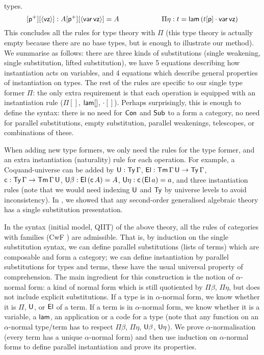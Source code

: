 \documentclass{easychair}
\begin{document}
types.
\[
[\mathsf{p}^+][\langle\mathsf{vz}\rangle] : A[\mathsf{p}^+][\langle\mathsf{var}\,\mathsf{vz}\rangle] = A \hspace{6em}\Pi\eta : t = \mathsf{lam}\,(t[\mathsf{p}]\cdot\mathsf{var}\,\mathsf{vz})
\]
This concludes all the rules for type theory with $\Pi$ (this type theory is actually empty because there are no base types, but is enough to illustrate our method). We summarise
as follows: there are three kinds of substitutions (single weakening,
single substitution, lifted substitution), we have 5 equations
describing how instantiation acts on variables, and 4 equations which
describe general properties of instantiation on types. The rest of the
rules are specific to our single type former $\Pi$: the only extra
requirement is that each operation is equipped with an instantiation
rule ($\Pi[]$, $\mathsf{lam}[]$, ${\cdot}[]$). Perhaps surprisingly, this is
enough to define the syntax: there is no need for $\mathsf{Con}$ and $\mathsf{Sub}$ to
a form a category, no need for parallel substitutions, empty
substitution, parallel weakenings, telescopes, or combinations of these.

When adding new type formers, we only need the rules for the type
former, and an extra instantiation (naturality) rule for each
operation. For example, a Coquand-universe can be added by $\mathsf{U} :
\mathsf{Ty}\,\Gamma$, $\mathsf{El}:\mathsf{Tm}\,\Gamma\,\mathsf{U}\rightarrow\mathsf{Ty}\,\Gamma$,
$\mathsf{c}:\mathsf{Ty}\,\Gamma\rightarrow\mathsf{Tm}\,\Gamma\,\mathsf{U}$, $\mathsf{U}\beta : \mathsf{El}\,(\mathsf{c}\,A) = A$,
$\mathsf{U}\eta : \mathsf{c}\,(\mathsf{El}\,a) = a$, and three instantiation rules (note that
we would need indexing $\mathsf{U}$ and $\mathsf{Ty}$ by universe levels to avoid inconsistency). In \cite{sogat}, we showed
that any second-order generalised algebraic theory has a
single substitution presentation.

In the syntax (initial model, QIIT) of
the above theory, all the rules of categories with families (CwF
\cite{DBLP:journals/corr/abs-1904-00827}) are admissible. That is, by
induction on the single substitution syntax, we can define parallel
substitutions (lists of terms) which are composable and form a
category; we can define instantiation by parallel substitutions for
types and terms, these have the usual universal property of
comprehension. The main ingredient for this construction is the notion
of $\alpha$-normal form: a kind of normal form which is still
quotiented by $\Pi\beta$, $\Pi\eta$, but does not include explicit
substitutions. If a type is in $\alpha$-normal form, we know whether
it is $\Pi$, $\mathsf{U}$, or $\mathsf{El}$ of a term. If a term is in $\alpha$-normal
form, we know whether it is a variable, a $\mathsf{lam}$, an application or a
code for a type (note that any function on an $\alpha$-normal type/term has to
respect $\Pi\beta$, $\Pi\eta$, $\mathsf{U}\beta$, $\mathsf{U}\eta$). We prove
$\alpha$-normalisation (every term has a unique $\alpha$-normal form)
and then use induction on $\alpha$-normal forms to define parallel
instantiation and prove its properties.
\end{document}
